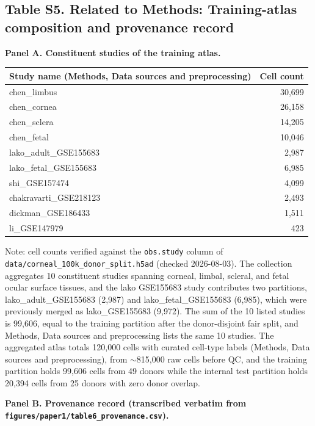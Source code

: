 \documentclass[12pt,a4paper]{article}
\begin{document}
\needspace{45mm}
\subsection*{Table S5. Related to Methods: Training-atlas composition and provenance record}
\label{tab:S5}

\textbf{Panel A. Constituent studies of the training atlas.}

\begingroup
\small
\begin{tabular}{lr}
\toprule
Study name (Methods, Data sources and preprocessing) & Cell count\\
\midrule
chen\_limbus & 30,699\\
chen\_cornea & 26,158\\
chen\_sclera & 14,205\\
chen\_fetal & 10,046\\
lako\_adult\_GSE155683 & 2,987\\
lako\_fetal\_GSE155683 & 6,985\\
shi\_GSE157474 & 4,099\\
chakravarti\_GSE218123 & 2,493\\
dickman\_GSE186433 & 1,511\\
li\_GSE147979 & 423\\
\bottomrule
\end{tabular}
\endgroup

Note: cell counts verified against the \texttt{obs.study} column of \texttt{data/corneal\_100k\_donor\_split.h5ad} (checked 2026-08-03). The collection aggregates 10 constituent studies spanning corneal, limbal, scleral, and fetal ocular surface tissues, and the lako GSE155683 study contributes two partitions, lako\_adult\_GSE155683 (2,987) and lako\_fetal\_GSE155683 (6,985), which were previously merged as lako\_GSE155683 (9,972). The sum of the 10 listed studies is 99,606, equal to the training partition after the donor-disjoint fair split, and Methods, Data sources and preprocessing lists the same 10 studies. The aggregated atlas totals 120,000 cells with curated cell-type labels (Methods, Data sources and preprocessing), from $\sim$815,000 raw cells before QC, and the training partition holds 99,606 cells from 49 donors while the internal test partition holds 20,394 cells from 25 donors with zero donor overlap.

\textbf{Panel B. Provenance record (transcribed verbatim from \texttt{figures/paper1/table6\_provenance.csv}).}
\end{document}

